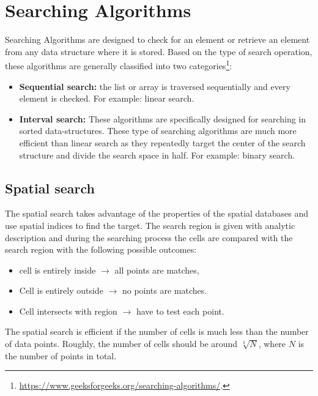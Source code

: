 \documentclass[12pt]{article}
\theoremstyle{plain}
\begin{document}




\section{Searching Algorithms}

Searching Algorithms are designed to check for an element or retrieve an element from any data structure where it is stored. Based on the type of search operation, these algorithms are generally classified into two categories\footnote{\url{https://www.geeksforgeeks.org/searching-algorithms/}.}:

\begin{itemize}
	\item \textbf{Sequential search:} the list or array is traversed sequentially and every element is checked. For example: linear search.
	\item \textbf{Interval search:} These algorithms are specifically designed for searching in sorted data-structures. These type of searching algorithms are much more efficient than linear search as they repeatedly target the center of the search structure and divide the search space in half. For example: binary search.
\end{itemize}



\subsection{Spatial search}

The spatial search takes advantage of the properties of the spatial databases and use spatial indices to find the target. The search region is given with analytic description and during the searching process the cells are compared with the search region with the following possible outcomes:

\begin{itemize}
	\item cell is entirely inside $\rightarrow$ all points are matches,
	\item Cell is entirely outside $\rightarrow$ no points are matches.
	\item Cell intersects with region $\rightarrow$ have to test each point.
\end{itemize}

The spatial search is efficient if the number of cells is much less than the number of data points. Roughly, the number of cells should be around $\sqrt[3]{N}$, where $N$ is the number of points in total.
\end{document}
